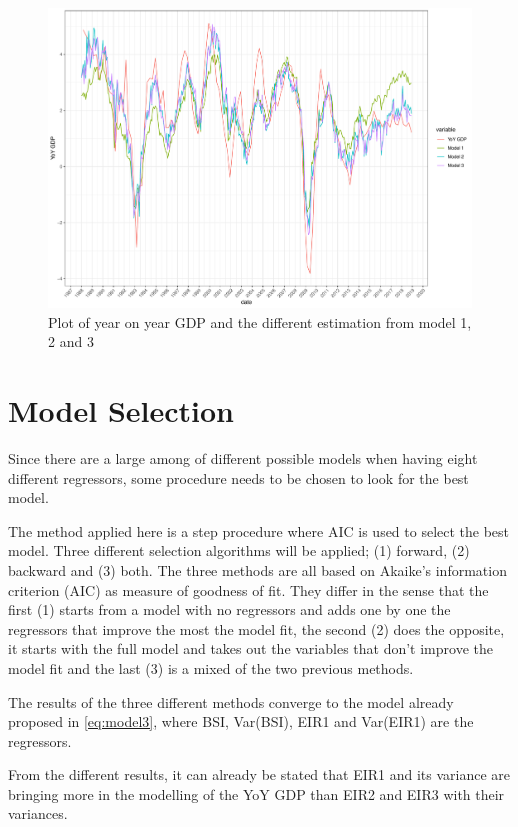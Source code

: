 \documentclass[12pt,a4paper,oneside]{book}
\begin{document}
\begin{figure}[!htbp]
    \centering
    \includegraphics[scale=0.6]{Graphs/predictions1.pdf}
    \caption{Plot of year on year GDP and the different estimation from model 1, 2 and 3}
    \label{fig:predictions1}
\end{figure}



\section{Model Selection}

Since there are a large among of different possible models when having eight different regressors, some procedure needs to be chosen to look for the best model.

The method applied here is a step procedure where AIC is used to select the best model.
Three different selection algorithms will be applied; (1) forward, (2) backward and  (3) both. 
The three methods are all based on Akaike's information criterion (AIC) as measure of goodness of fit. They differ in the sense that the first (1) starts from a model with no regressors and adds one by one the regressors that improve the most the model fit, the second (2) does the opposite, it starts with the full model and takes out the variables that don't improve the model fit and the last (3) is a mixed of the two previous methods.

The results of the three different methods converge to the model already proposed in \autoref{eq:model3}, where BSI, Var(BSI), EIR1 and Var(EIR1) are the regressors.

From the different results, it can already be stated that EIR1 and its variance are bringing more in the modelling of the YoY GDP than EIR2 and EIR3 with their variances.
\end{document}

